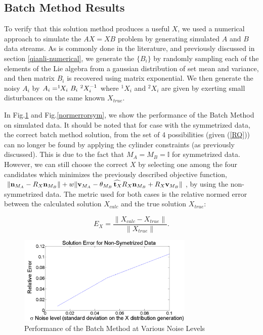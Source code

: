 \documentclass[twocolumn,10pt]{asme2ej}
\begin{document}
\subsection{Batch Method Results}
To verify that this solution method produces a useful $X$, we used a numerical approach to simulate the $AX=XB$ problem by generating simulated $A$ and $B$ data streams. As is commonly done in the literature, and previously discussed in section \ref{qianli-numerical}, we generate the $\{B_{i}\}$ by randomly sampling each of the elements of the Lie algebra from a gaussian distribution of set mean and variance, and then matrix $B_{i}$ is recovered using matrix exponential. We then generate the noisy $A_{i}$ by $A_{i}= ^1\hspace{-0.05in}X_{i}\,\,B_i\,\,^2X_{i}^{-1}$ where $^1X_{i}$ and $^2X_{i}$ are given by exerting small disturbances on the same known $X_{true}$.

In Fig.\ref{normerror} and Fig.\ref{normerrorsym}, we show the performance of the Batch Method on simulated data. It should be noted that for case with the symmetrized data, the correct batch method solution, from the set of 4 possibilities (given (\ref{RQ})) can no longer be found by applying the cylinder constraints (as previously discussed). This is due to the fact that $M_A=M_B=\mathbb{I}$ for symmetrized data. However, we can still choose the correct $X$ by selecting one among the four candidates which minimizes the previously described objective function, $\| {\bf n}_{M_A}-R_X {\bf n}_{M_B} \|+w \| {\bf v}_{M_A} - \theta_{M_B} \widehat{\,{\bf t}_X} R_X {\bf n}_{M_B} + R_X {\bf v}_{M_B} \|$, by using the non-symmetrized data. The metric used for both cases is the relative normed error between the calculated solution $X_{calc}$ and the true solution $X_{true}$:

$$
E_{X} = \frac{\|X_{calc}-X_{true}\|}{\|X_{true}\|}.
$$  

\begin{figure}[h]
\includegraphics[width=3.3in]{figure/normerror}
\centering
\caption{Performance of the Batch Method at Various Noise Levels}
\label{normerror}
\end{figure}
\end{document}
